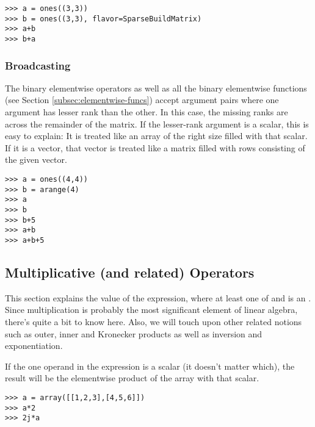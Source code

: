 \begin{verbatim}
>>> a = ones((3,3))
>>> b = ones((3,3), flavor=SparseBuildMatrix)
>>> a+b
>>> b+a
\end{verbatim}

\subsubsection{Broadcasting} \label{sssec:arraybroadcast}
The binary elementwise operators as well as all the binary elementwise
functions (see Section \ref{subsec:elementwise-funcs}) accept argument pairs
where one argument has lesser rank than the other. In this case, the missing
ranks are  across the remainder of the
matrix. If the lesser-rank argument is a scalar, this is easy to explain: It is
treated like an array of the right size filled with that scalar.  If it is a
vector, that vector is treated like a matrix filled with rows consisting of the
given vector.

\begin{verbatim}
>>> a = ones((4,4))
>>> b = arange(4)
>>> a
>>> b
>>> b+5
>>> a+b
>>> a+b+5
\end{verbatim}
\subsection{Multiplicative (and related) Operators}
\label{subsec:arraymultiplication}
This section explains the value of the expression, where at
least one of  and  is an . Since multiplication
is probably the most significant element of linear algebra, there's quite
a bit to know here. Also, we will touch upon other related notions such as outer,
inner and Kronecker products as well as inversion and exponentiation.

If the one operand in the expression  is a scalar (it doesn't matter
which), the result will be the elementwise product of the array with that
scalar.

\begin{verbatim}
>>> a = array([[1,2,3],[4,5,6]])
>>> a*2
>>> 2j*a
\end{verbatim}

